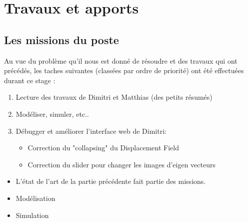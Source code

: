
\chapter{Travaux et apports} %

\label{Chapter4} %




\section{Les missions du poste}



Au vue du problème qu'il nous est donné de résoudre et des travaux qui ont précédés, les taches suivantes (classées par ordre de priorité) ont été effectuées durant ce stage :

\begin{enumerate}
    \item Lecture des travaux de Dimitri et Matthias (des petits résumés)
    \item Modéliser, simuler, etc..
    \item Débugger et améliorer l'interface web de Dimitri:
    \begin{itemize}
        \item Correction du "collapsing" du Displacement Field
        \item Correction du slider pour changer les images d'eigen vecteurs
    \end{itemize}
\end{enumerate}







\begin{itemize}
    \item L'état de l'art de la partie précédente fait partie des missions.
    \item Modélisation
    \item Simulation
\end{itemize}

